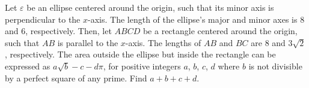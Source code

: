 Let $\varepsilon$ be an ellipse centered around the origin, such that its minor axis is perpendicular to the $x$-axis. The length of the ellipse's major and minor axes is $8$ and $6$, respectively. Then, let $ABCD$ be a rectangle centered around the origin, such that $AB$ is parallel to the $x$-axis. The lengths of $AB$ and $BC$ are $8$ and $3\sqrt2$, respectively. The area outside the ellipse but inside the rectangle can be expressed as $a\sqrt{b}-c-d\pi$, for positive integers $a$, $b$, $c$, $d$ where $b$ is not divisible by a perfect square of any prime. Find $a + b + c + d$.
